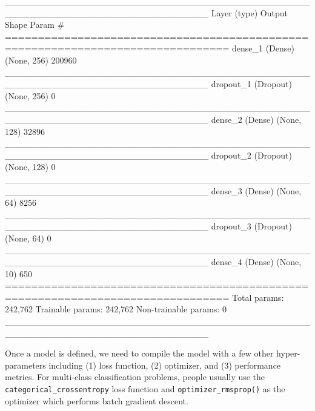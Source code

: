 \documentclass[12pt,]{krantz}
\makeatletter
\newenvironment{Shaded}{\begin{snugshade}}{\end{snugshade}}
\newcommand{\DataTypeTok}[1]{\textcolor[rgb]{0.27,0.27,0.27}{#1}}
\newcommand{\KeywordTok}[1]{\textcolor[rgb]{0.27,0.27,0.27}{\textbf{#1}}}
\newcommand{\NormalTok}[1]{#1}
\newcommand{\OperatorTok}[1]{\textcolor[rgb]{0.43,0.43,0.43}{\textbf{#1}}}
\newcommand{\StringTok}[1]{\textcolor[rgb]{0.5,0.5,0.5}{#1}}
\newenvironment{kframe}{%
\medskip{}
\setlength{\fboxsep}{.8em}
 \def\at@end@of@kframe{}%
 \ifinner\ifhmode%
  \def\at@end@of@kframe{\end{minipage}}%
  \begin{minipage}{\columnwidth}%
 \fi\fi%
 \def\FrameCommand##1{\hskip\@totalleftmargin \hskip-\fboxsep
 \colorbox{shadecolor}{##1}\hskip-\fboxsep
     \hskip-\linewidth \hskip-\@totalleftmargin \hskip\columnwidth}%
 \MakeFramed {\advance\hsize-\width
   \@totalleftmargin\z@ \linewidth\hsize
   \@setminipage}}%
 {\par\unskip\endMakeFramed%
 \at@end@of@kframe}
\renewenvironment{Shaded}{\begin{kframe}}{\end{kframe}}
\makeatother
\begin{document}
\begin{Shaded}
\begin{Highlighting}[]
\NormalTok{________________________________________________________________________________}
\NormalTok{Layer (type)                        Output Shape                    Param #     }
\NormalTok{================================================================================}
\NormalTok{dense_1 (Dense)                     (None, 256)                     200960      }
\NormalTok{________________________________________________________________________________}
\NormalTok{dropout_1 (Dropout)                 (None, 256)                     0           }
\NormalTok{________________________________________________________________________________}
\NormalTok{dense_2 (Dense)                     (None, 128)                     32896       }
\NormalTok{________________________________________________________________________________}
\NormalTok{dropout_2 (Dropout)                 (None, 128)                     0           }
\NormalTok{________________________________________________________________________________}
\NormalTok{dense_3 (Dense)                     (None, 64)                      8256        }
\NormalTok{________________________________________________________________________________}
\NormalTok{dropout_3 (Dropout)                 (None, 64)                      0           }
\NormalTok{________________________________________________________________________________}
\NormalTok{dense_4 (Dense)                     (None, 10)                      650         }
\NormalTok{================================================================================}
\NormalTok{Total params: 242,762}
\NormalTok{Trainable params: 242,762}
\NormalTok{Non-trainable params: 0}
\NormalTok{________________________________________________________________________________}
\end{Highlighting}
\end{Shaded}

Once a model is defined, we need to compile the model with a few other hyper-parameters including (1) loss function, (2) optimizer, and (3) performance metrics. For multi-class classification problems, people usually use the \texttt{categorical\_crossentropy} loss function and \texttt{optimizer\_rmsprop()} as the optimizer which performs batch gradient descent.

\begin{Shaded}
\end{Shaded}
\end{document}
